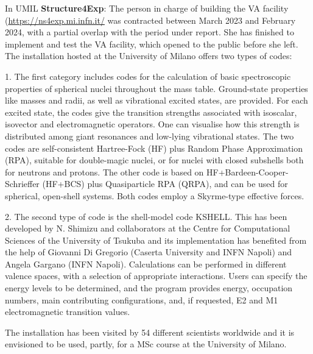 In UMIL \textbf{Structure4Exp}: The person in charge of building the VA facility (\url{https://ns4exp.mi.infn.it/} was contracted between March 2023 and February 2024, with a partial overlap with the period under report. She has finished to implement and test the VA facility, which opened to the public before she left.  The installation hosted at the University of Milano offers two types of codes:

1. The first category includes codes for the calculation of basic spectroscopic properties of spherical nuclei throughout the mass table. Ground-state properties like masses and radii, as well as vibrational excited states, are provided. For each excited state, the codes give the transition strengths associated with isoscalar, isovector and electromagnetic operators. One can visualise how this strength is distributed among giant resonances and low-lying vibrational states. The two codes are self-consistent Hartree-Fock (HF) plus Random Phase Approximation (RPA), suitable for double-magic nuclei, or for nuclei with closed subshells both for neutrons and protons. The other code is based on HF+Bardeen-Cooper-Schrieffer (HF+BCS) plus Quasiparticle RPA (QRPA), and can be used for spherical, open-shell systems. Both codes employ a Skyrme-type effective forces.

2. The second type of code is the shell-model code KSHELL. This has been developed by N. Shimizu and collaborators at the Centre for Computational Sciences of the University of Tsukuba and its implementation has benefited from the help of Giovanni Di Gregorio (Caserta University and INFN Napoli) and Angela Gargano (INFN Napoli). Calculations can be performed in different valence spaces, with a selection of appropriate interactions. Users can specify the energy levels to be determined, and the program provides energy, occupation numbers, main contributing configurations, and, if requested, E2 and M1 electromagnetic transition values. 

The installation has been visited by 54 different scientists worldwide  and it is envisioned to be used, partly, for a MSc course at the University of Milano.

